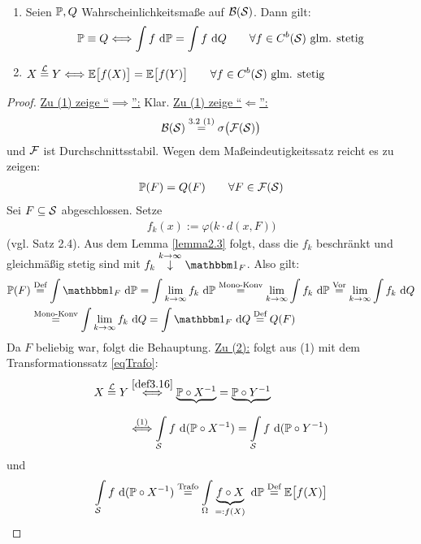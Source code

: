 \begin{satz}\label{satz3.17}\
\begin{enumerate}[label=(\arabic*)]
\item Seien $\P,Q$ Wahrscheinlichkeitsmaße auf $\B(\S)$. Dann gilt:
\begin{align*}
\P\equiv Q\Longleftrightarrow
\int\limits f\d\P=\int\limits f\d Q\qquad\forall f\in C^b(\S)\text{ glm. stetig}
\end{align*}
\item $\begin{aligned}
X\stackeq{\mathcal{L}} Y\Longleftrightarrow
\E\big[f(X)\big]=\E\big[f(Y)\big]\qquad\forall f\in C^b(\S)\text{ glm. stetig}
\end{aligned}$
\end{enumerate}
\end{satz}
\begin{proof}
\underline{Zu (1) zeige ``$\implies$'':} Klar.\nl
\underline{Zu (1) zeige ``$\Longleftarrow$'':}
\begin{align*}
\B(\S)\stackeq{\text{3.2 (1)}}\sigma\big(\mathcal{F}(\S)\big)
\end{align*}
und $\F$ ist Durchschnittsstabil. Wegen dem Maßeindeutigkeitssatz reicht es zu zeigen:
\begin{align*}
\P(F)=Q(F)\qquad\forall F\in\mathcal{F}(\S)
\end{align*}
Sei $F\subseteq\S$ abgeschlossen. Setze
\begin{align*}
f_k(x):=\varphi\Big(k\cdot d(x,F)\Big)
\end{align*}
(vgl. Satz 2.4). Aus dem Lemma \ref{lemma2.3} folgt, dass die $f_k$ beschränkt und gleichmäßig stetig sind mit $f_k\stackrel{k\to\infty}{\downarrow}\indi_F$. Also gilt:
\begin{align*}
\P(F)
&\stackeq{\text{Def}}
\int\limits\indi_F\d\P
=\int\limits\lim\limits_{k\to\infty} f_k\d\P
\stackeq{\text{Mono-Konv}}
\lim\limits_{k\to\infty}\int\limits f_k\d\P
\stackeq{\text{Vor}}
\lim\limits_{k\to\infty}\int\limits f_k\d Q\\
&\stackeq{\text{Mono-Konv}}
\int\limits\lim\limits_{k\to\infty} f_k\d Q
=\int\limits\indi_F\d Q
\stackeq{\text{Def}} Q(F)
\end{align*}
Da $F$ beliebig war, folgt die Behauptung.\nl
\underline{Zu (2):} folgt aus (1) mit dem Transformationssatz \eqref{eqTrafo}:
\begin{align*}
X\stackeq{\mathcal{L}} Y
&\stackrel{\ref{def3.16}}{\Longleftrightarrow}
\underbrace{\P\circ X^{-1}}_{}=\underbrace{\P\circ Y^{-1}}_{}\\
&\stackrel{(1)}{\Longleftrightarrow}
\int\limits_{\S} f\d(\P\circ X^{-1})=\int\limits_{\S} f\d(\P\circ Y^{-1})
\end{align*}
und
\begin{align*}
\int\limits_{\S} f\d(\P\circ X^{-1})
\stackeq{\text{Trafo}}
\int\limits_{\Omega}\underbrace{f\circ X}_{=:f(X)}\d\P
\stackeq{\text{Def}}
\E\big[f(X)\big]
\end{align*}
\end{proof}

